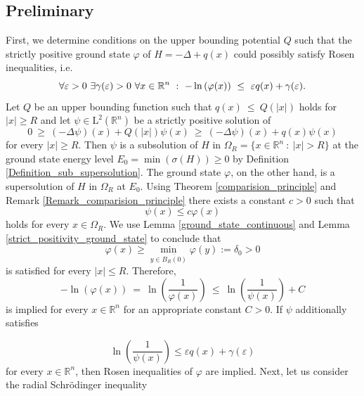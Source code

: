\documentclass[12pt,longbibliography]{article}
\def\R{\mathbb{R}}
\theoremstyle{definition}
\theoremstyle{remark}
\theoremstyle{example}
\begin{document}
\subsection{Preliminary} \label{Preliminary}

First, we determine conditions on the upper bounding potential $Q$ such that the 
strictly positive ground state $\varphi$ of $H = -\Delta + q(x)$ could possibly satisfy Rosen inequalities, i.e.
\begin{equation*}
\forall \varepsilon > 0 \ \exists \gamma(\varepsilon) > 0 \ \forall x \in \R^{n} \ : \ 
-\ln \left( \varphi(x) \right) \ \leq \ \varepsilon q(x) + \gamma(\varepsilon).\\
\end{equation*}
Let $Q$ be an upper bounding function such that $q(x) \ \leq \ Q \left( |x| \right)$
holds for $ |x| \geq R$ and let $\psi \in \mathrm{L}^{2} \left( \R^{n} \right)$ be a strictly positive solution of
\begin{equation}\label{psi_subsolution}
0 \ \geq \ \left( - \Delta \psi \right) (x) + Q\left(  |x| \right) \psi(x) \ \geq \ \left( - \Delta \psi \right) (x) + q\left( x \right) \psi(x)
\end{equation}
for every $|x| \geq R$. Then $\psi$ is a subsolution of $H$ in $\Omega_{R} = \{ x \in \R^{n} \ : \ |x| > R \}$ at the ground state 
energy level $E_{0} = \min \left( \sigma(H) \right) \geq 0$ by Definition \ref{Definition_sub_supersolution}.
The ground state $\varphi$, on the other hand, is a supersolution 
of $H$ in $\Omega_{R}$ at $E_{0}$. Using Theorem \ref{comparision_principle} and Remark \ref{Remark_comparision_principle} 
there exists a constant $c > 0$ such that 
$$
\psi(x)\leq c \varphi(x)
$$
holds for every  $x \in \Omega_{R}$. We use Lemma \ref{ground_state_continuous} and 
Lemma \ref{strict_positivity_ground_state} to conclude that
$$
\varphi(x) \geq \min_{y \in \overline{B_{R}(0)}} \varphi(y) := \delta_{0} > 0
$$
is satisfied for every $|x| \leq R$. Therefore,
\begin{equation}\label{Rosen_psi_phi}
-\ln \left( \varphi(x) \right) \ = \ \ln \left( \frac{1}{\varphi(x)} \right) \ \leq \ \ln \left( \frac{1}{\psi(x)} \right) + C
\end{equation}
is implied for every $x \in \R^{n}$ for an appropriate constant $C > 0$. If $\psi$ additionally satisfies 

\begin{equation}\label{psi_Rosen}
 \ln \left( \frac{1}{\psi(x)} \right) \leq \varepsilon q(x) + \gamma(\varepsilon)
\end{equation}
for every $x \in \R^{n}$, then Rosen inequalities of $\varphi$ are implied. 
Next, let us consider the radial Schrödinger inequality
\end{document}
